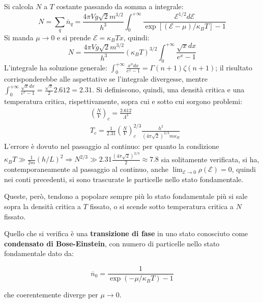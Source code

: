 \documentclass[10pt, a4paper]{scrartcl}
\numberwithin{equation}{subsection}
\theoremstyle{style1}
\newenvironment{boxenv}[1][]{
    \begin{eqbox}[#1]
    }{
   \end{eqbox}
}
\begin{document}
Si calcola $N$ a $T$ costante passando da somma a integrale:
\[
N = \sum_{q}^{} \overline{n}_q = \frac{4\pi V g \sqrt{2} m^{3 / 2} }{h^3}\int_{0} ^{+\infty} \frac{\mathscr{E}^{1 / 2} d\mathscr{E}}{\exp\left[ (\mathscr{E}-\mu ) / \kappa _B T \right] - 1}
\] 
Si manda $\mu \to 0$ e si prende $\mathscr{E} = \kappa _B T x$, quindi:
\[
N = \frac{4\pi V g \sqrt{2} m^{3 / 2} }{h^3} (\kappa _B T)^{3 / 2} \int_{0} ^{+\infty}  \frac{\sqrt{x} dx}{e^x - 1}
\] 
L'integrale ha soluzione generale: $\int_{0} ^{+\infty} \frac{x^n dx}{e^x - 1} = \Gamma(n+1) \zeta(n+1)$;
il risultato corrisponderebbe alle aspettative se l'integrale divergesse, mentre $\int_{0} ^{+\infty} \frac{\sqrt{x} dx}{e^x - 1} =\frac{\sqrt{\pi} }{2}2.612= 2.31$. 
Si definiscono, quindi, una densit\`a critica e una temperatura critica, rispettivamente, sopra cui e sotto cui sorgono problemi:
\begin{equation}
	\begin{split}
		& \left(\frac{N}{V}\right) _c = \frac{2.612}{\Lambda ^3}\\
		& T_c = \frac{1}{2.31} \left(\frac{N}{V}\right) _c^{2 / 3} \frac{h^2}{(4\pi \sqrt{2} )^{2/3} m\kappa _B }
	\end{split}
\end{equation}
L'errore \`e dovuto nel passaggio al continuo: per quanto la condizione $\kappa _B T \gg \frac{1}{2m} (h / L)^2\Rightarrow N^{2 / 3} \gg 2.31 \frac{(4\pi \sqrt{2} )^{2/3} }{2} \approx 7.8$ sia solitamente verificata, si ha, contemporaneamente al passaggio al continuo, anche $\lim_{\mathscr{E} \to 0} \rho (\mathscr{E}) =0$, quindi nei conti precedenti, si sono trascurate le particelle nello stato fondamentale.

Queste, per\`o, tendono a popolare sempre pi\`u lo stato fondamentale pi\`u si sale sopra la densit\`a critica a $T$ fissato, o si scende sotto temperatura critica a $N$ fissato.

Quello che si verifica \`e una \textbf{transizione di fase} in uno stato conosciuto come \textbf{condensato di Bose-Einstein}, con numero di particelle nello stato fondamentale dato da:
\begin{boxenv}[]
\begin{equation}
	\overline{n}_0 = \frac{1}{\exp(-\mu / \kappa _B T) - 1}
\end{equation}
\end{boxenv}
\noindent che coerentemente diverge per $\mu \to 0$.
\end{document}
